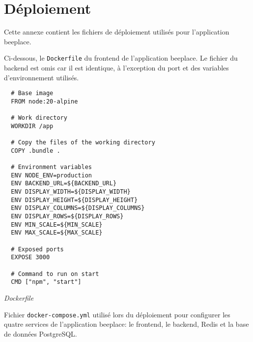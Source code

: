 \chapter{Déploiement}
\label{annexe-deploiement}

Cette annexe contient les fichiers de déploiement utilisés pour l'application \gls{beeplace}.

Ci-dessous, le \texttt{Dockerfile} du frontend de l'application \gls{beeplace}. Le fichier du backend est omis car il est identique, à l'exception du port et des variables d'environnement utilisés.

\begin{verbatim}
  # Base image
  FROM node:20-alpine

  # Work directory
  WORKDIR /app

  # Copy the files of the working directory
  COPY .bundle .

  # Environment variables
  ENV NODE_ENV=production
  ENV BACKEND_URL=${BACKEND_URL}
  ENV DISPLAY_WIDTH=${DISPLAY_WIDTH}
  ENV DISPLAY_HEIGHT=${DISPLAY_HEIGHT}
  ENV DISPLAY_COLUMNS=${DISPLAY_COLUMNS}
  ENV DISPLAY_ROWS=${DISPLAY_ROWS}
  ENV MIN_SCALE=${MIN_SCALE}
  ENV MAX_SCALE=${MAX_SCALE}

  # Exposed ports
  EXPOSE 3000

  # Command to run on start
  CMD ["npm", "start"]
\end{verbatim}
\begin{center}
  \textit{Dockerfile}
\end{center}

\pagebreak

Fichier \texttt{docker-compose.yml} utilisé lors du déploiement pour configurer les quatre services de l'application \gls{beeplace}: le frontend, le backend, Redis et la base de données PostgreSQL.

